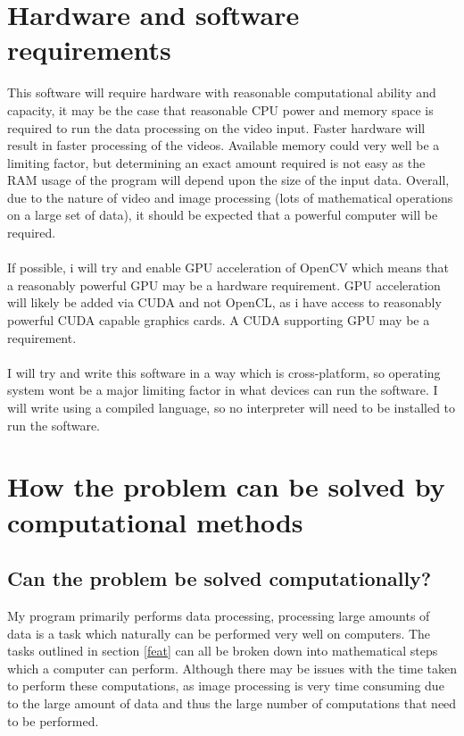 \documentclass[11pt]{report}
\begin{document}
\section{Hardware and software requirements}
This software will require hardware with reasonable computational ability and capacity, it may be the case that reasonable CPU power and memory space is required to run the data processing on the video input. Faster hardware will result in faster processing of the videos.
Available memory could very well be a limiting factor, but determining an exact amount required is not easy as the RAM usage of the program will depend upon the size of the input data. Overall, due to the nature of video and image processing (lots of mathematical operations on a large set of data), it should be expected that a powerful computer will be required.\\\\ If possible, i will try and enable GPU acceleration of OpenCV which means that a reasonably powerful GPU may be a hardware requirement. GPU acceleration will likely be added via CUDA and not OpenCL, as i have access to reasonably powerful CUDA capable graphics cards. A CUDA supporting GPU may be a requirement.\\\\
I will try and write this software in a way which is cross-platform, so operating system wont be a major limiting factor in what devices can run the software. I will write using a compiled language, so no interpreter will need to be installed to run the software.

\section{How the problem can be solved by computational methods}
\subsection{Can the problem be solved computationally?}
My program primarily performs data processing, processing large amounts of data is a task which naturally can be performed very well on computers. The tasks outlined in section \ref{feat} can all be broken down into mathematical steps which a computer can perform. Although there may be issues with the time taken to perform these computations, as image processing is very time consuming due to the large amount of data and thus the large number of computations that need to be performed.
\end{document}
